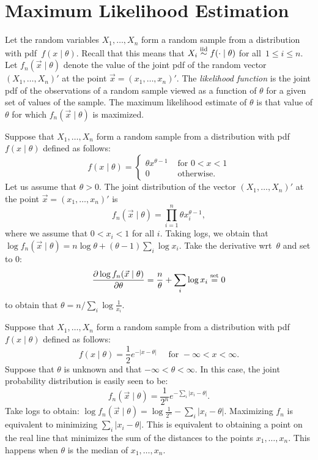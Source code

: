 \section{Maximum Likelihood Estimation}
Let the random variables $X_1, \ldots, X_n$ form a random sample from a 
distribution with pdf~$f(x \mid \theta)$. Recall that this means that 
$X_i \stackrel{\text{iid}}{\sim} f( \cdot \mid \theta)$ for all~$1 \leq i \leq n$. 
Let $f_n(\vec{x} \mid \theta)$ denote the value of the joint pdf of 
the random vector $(X_1, \ldots, X_n)'$ at the point 
$\vec{x} = (x_1, \ldots, x_n)'$. The \emph{likelihood function} is the joint pdf 
of the observations of a random sample viewed as a function of $\theta$ for 
a given set of values of the sample. The maximum likelihood estimate of 
$\theta$ is that value of $\theta$ for which $f_n (\vec{x} \mid \theta)$ is 
maximized. 
\begin{example}
Suppose that $X_1, \ldots, X_n$ form a random sample from a distribution with 
pdf $f(x \mid \theta)$ defined as follows:
\[
    f(x \mid \theta) = 
        \left \{
            \begin{array}{ll}
                \theta x^{\theta - 1} & \text{ for } 0 < x < 1 \\
                0                     & \text{ otherwise}.
            \end{array} 
        \right .
\]
Let us assume that $\theta > 0$. The joint distribution of the vector 
$(X_1, \ldots, X_n)'$ at the point $\vec{x} = (x_1, \ldots, x_n)'$ is 
\[
    f_n (\vec{x} \mid \theta ) = \prod_{i = 1}^n \theta x_i^{\theta - 1},
\]
where we assume that $0 < x_i < 1$ for all $i$. Taking logs, we obtain that
$\log f_n (\vec{x} \mid \theta) = n \log \theta + (\theta - 1) \sum_i \log x_i$. 
Take the derivative wrt~$\theta$ and set to $0$:
\[
    \frac{\partial \log f_n (\vec{x} \mid \theta)}{\partial \theta} = 
        \frac{n}{\theta} + \sum_i \log x_i \stackrel{\text{set}}{=} 0
\]
to obtain that $\theta = n / \sum_i \log \frac{1}{x_i}$.
\end{example}   

\begin{example}
Suppose that $X_1, \ldots, X_n$ form a random sample from a distribution with 
pdf $f(x \mid \theta)$ defined as follows:
\[
    f(x \mid \theta) = \frac{1}{2} e^{- |x - \theta|} 
        \quad \text{ for } -\infty < x < \infty.
\]
Suppose that $\theta$ is unknown and that $-\infty < \theta < \infty$. 
In this case, the joint probability distribution is easily seen to be:
\[
    f_n(\vec{x} \mid \theta) = \frac{1}{2^n} e^{- \sum_i |x_i - \theta|}.
\]
Take logs to obtain: 
$\log f_n (\vec{x} \mid \theta) = \log \frac{1}{2^n} - \sum_i |x_i - \theta|$. 
Maximizing $f_n$ is equivalent to minimizing $\sum_i |x_i - \theta|$. This 
is equivalent to obtaining a point on the real line that minimizes the sum 
of the distances to the points $x_1, \ldots, x_n$. This happens when $\theta$
is the median of $x_1, \ldots, x_n$.
\end{example}

